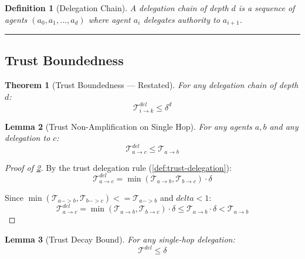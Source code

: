 \documentclass[
]{article}
\newtheorem{definition}{Definition}[section]
\newtheorem{theorem}{Theorem}[section]
\newtheorem{lemma}[theorem]{Lemma}
\begin{document}
\begin{definition}[Delegation Chain]
\label{def:delegation-chain}
A delegation chain of depth $d$ is a sequence of agents $(a_0, a_1, \ldots, a_d)$ where agent $a_i$ delegates authority to $a_{i+1}$.
\end{definition}

\begin{center}\rule{0.5\linewidth}{0.5pt}\end{center}

\subsection{Trust Boundedness}\label{sec:thm42-proof}

\begin{theorem}[Trust Boundedness --- Restated]
\label{thm:trust-bound-restated}
For any delegation chain of depth $d$:
\begin{equation}
\label{eq:trust-bound-restated}
\mathcal{T}_{i \to k}^{del} \leq \delta^d
\end{equation}
\end{theorem}

\begin{lemma}[Trust Non-Amplification on Single Hop]
\label{lem:single-hop}
For any agents $a, b$ and any delegation to $c$:
\begin{equation}
\label{eq:single-hop}
\mathcal{T}_{a \to c}^{del} \leq \mathcal{T}_{a \to b}
\end{equation}
\end{lemma}

\begin{proof}[Proof of \cref{lem:single-hop}]
By the trust delegation rule (\cref{def:trust-delegation}):
\begin{equation}
\label{eq:lem-single-hop-1}
\mathcal{T}_{a \to c}^{del} = \min(\mathcal{T}_{a \to b}, \mathcal{T}_{b \to c}) \cdot \delta
\end{equation}

Since $\min(\mathcal{T}_{a -> b}, \mathcal{T}_{b -> c}) <= \mathcal{T}_{a -> b}$ and $delta < 1$:
\begin{equation}
\label{eq:lem-single-hop-2}
\mathcal{T}_{a \to c}^{del} = \min(\mathcal{T}_{a \to b}, \mathcal{T}_{b \to c}) \cdot \delta \leq \mathcal{T}_{a \to b} \cdot \delta < \mathcal{T}_{a \to b}
\end{equation}
\end{proof}

\begin{lemma}[Trust Decay Bound]
\label{lem:decay-bound}
For any single-hop delegation:
\begin{equation}
\label{eq:decay-bound}
\mathcal{T}^{del} \leq \delta
\end{equation}
\end{lemma}
\end{document}
